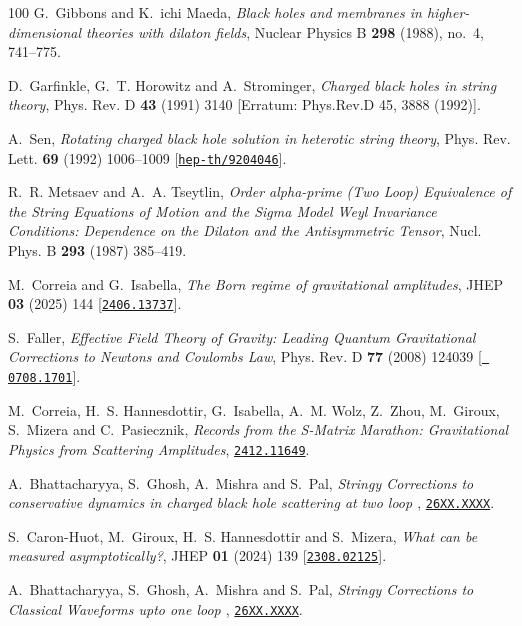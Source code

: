 \begin{thebibliography}{100}
G.~Gibbons and K.~ichi Maeda,  {\em Black holes and membranes in
  higher-dimensional theories with dilaton fields}, Nuclear Physics B {\bf 298}
  (1988), no.~4, 741--775.

D.~Garfinkle, G.~T. Horowitz and A.~Strominger,  {\em {Charged black holes in
  string theory}}, Phys. Rev. D {\bf 43} (1991) 3140 [Erratum: Phys.Rev.D 45,
  3888 (1992)].

A.~Sen,  {\em {Rotating charged black hole solution in heterotic string
  theory}}, Phys. Rev. Lett. {\bf 69} (1992) 1006--1009
  [\href{http://www.arXiv.org/abs/hep-th/9204046}{{\tt hep-th/9204046}}].

R.~R. Metsaev and A.~A. Tseytlin,  {\em {Order alpha-prime (Two Loop)
  Equivalence of the String Equations of Motion and the Sigma Model Weyl
  Invariance Conditions: Dependence on the Dilaton and the Antisymmetric
  Tensor}}, Nucl. Phys. B {\bf 293} (1987) 385--419.

M.~Correia and G.~Isabella,  {\em {The Born regime of gravitational
  amplitudes}}, JHEP {\bf 03} (2025) 144
  [\href{http://www.arXiv.org/abs/2406.13737}{{\tt 2406.13737}}].

S.~Faller,  {\em {Effective Field Theory of Gravity: Leading Quantum
  Gravitational Corrections to Newtons and Coulombs Law}}, Phys. Rev. D {\bf
  77} (2008) 124039 [\href{http://www.arXiv.org/abs/0708.1701}{{\tt
  0708.1701}}].

M.~Correia, H.~S. Hannesdottir, G.~Isabella, A.~M. Wolz, Z.~Zhou, M.~Giroux,
  S.~Mizera and C.~Pasiecznik,  {\em {Records from the S-Matrix Marathon:
  Gravitational Physics from Scattering Amplitudes}},
  \href{http://www.arXiv.org/abs/2412.11649}{{\tt 2412.11649}}.

A.~Bhattacharyya, S.~Ghosh, A.~Mishra and S.~Pal,  {\em {Stringy Corrections to
  conservative dynamics in charged black hole scattering at two loop }},
  \href{http://www.arXiv.org/abs/26XX.XXXX}{{\tt 26XX.XXXX}}.

S.~Caron-Huot, M.~Giroux, H.~S. Hannesdottir and S.~Mizera,  {\em {What can be
  measured asymptotically?}}, JHEP {\bf 01} (2024) 139
  [\href{http://www.arXiv.org/abs/2308.02125}{{\tt 2308.02125}}].

A.~Bhattacharyya, S.~Ghosh, A.~Mishra and S.~Pal,  {\em {Stringy Corrections to
  Classical Waveforms upto one loop }},
  \href{http://www.arXiv.org/abs/26XX.XXXX}{{\tt 26XX.XXXX}}.


\end{thebibliography}
